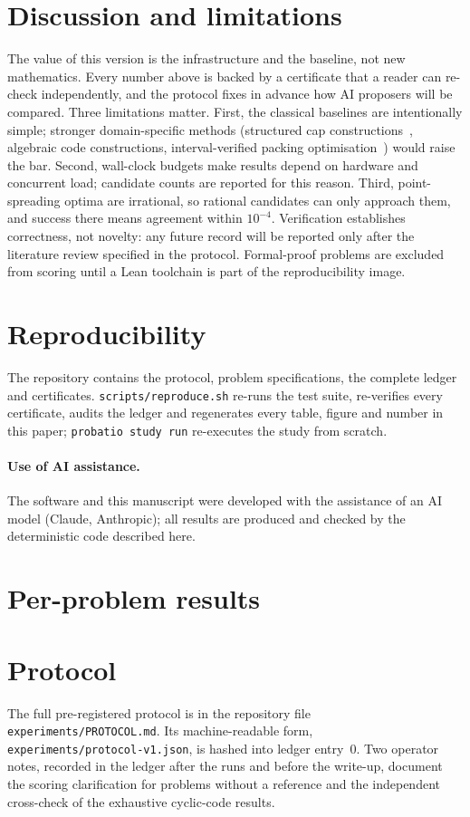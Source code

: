 \documentclass[11pt]{article}
\begin{document}
\section{Discussion and limitations}
The value of this version is the infrastructure and the baseline, not new mathematics.
Every number above is backed by a certificate that a reader can re-check independently, and
the protocol fixes in advance how AI proposers will be compared. Three limitations matter.
First, the classical baselines are intentionally simple; stronger domain-specific methods
(structured cap constructions~\citep{edel2004}, algebraic code constructions,
interval-verified packing optimisation~\citep{markot2005}) would raise the bar. Second,
wall-clock budgets make results depend on hardware and concurrent load; candidate counts
are reported for this reason. Third, point-spreading optima are irrational, so rational
candidates can only approach them, and success there means agreement within $10^{-4}$.
Verification establishes correctness, not novelty: any future record will be reported only
after the literature review specified in the protocol. Formal-proof problems are excluded
from scoring until a Lean toolchain is part of the reproducibility image.

\section{Reproducibility}
The repository contains the protocol, problem specifications, the complete ledger and
certificates. \texttt{scripts/reproduce.sh} re-runs the test suite, re-verifies every
certificate, audits the ledger and regenerates every table, figure and number in this
paper; \texttt{probatio study run} re-executes the study from scratch.

\paragraph{Use of AI assistance.} The software and this manuscript were developed with
the assistance of an AI model (Claude, Anthropic); all results are produced and checked by
the deterministic code described here.



\appendix
\section{Per-problem results}
\small


\section{Protocol}\label{app:protocol}
The full pre-registered protocol is in the repository file\\
\texttt{experiments/PROTOCOL.md}. Its machine-readable form,\\
\texttt{experiments/protocol-v1.json}, is hashed into ledger entry~0. Two operator notes,
recorded in the ledger after the runs and before the write-up, document the scoring
clarification for problems without a reference and the independent cross-check of the
exhaustive cyclic-code results.
\end{document}
